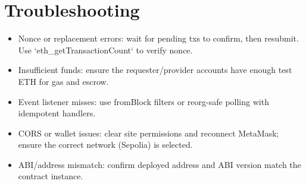 \section{Troubleshooting}
\begin{itemize}
  \item Nonce or replacement errors: wait for pending txs to confirm, then resubmit. Use `eth_getTransactionCount` to verify nonce.
  \item Insufficient funds: ensure the requester/provider accounts have enough test ETH for gas and escrow.
  \item Event listener misses: use fromBlock filters or reorg-safe polling with idempotent handlers.
  \item CORS or wallet issues: clear site permissions and reconnect MetaMask; ensure the correct network (Sepolia) is selected.
  \item ABI/address mismatch: confirm deployed address and ABI version match the contract instance.
\end{itemize}
